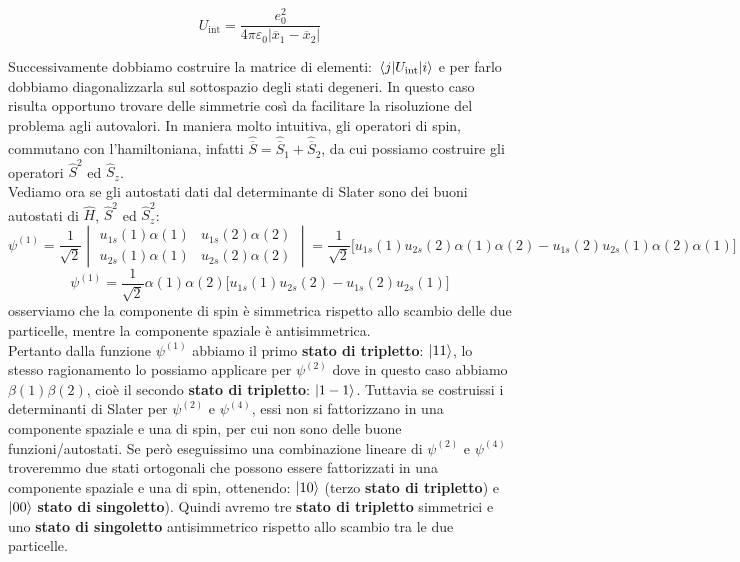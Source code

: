 \begin{equation*}
    U_{\text{int}}=\frac{e_0^2}{4\pi\varepsilon_0|\overline{x}_1-\overline{x}_2|}
\end{equation*}

Successivamente dobbiamo costruire la matrice di elementi: $\mel {j}{U_{\text{int}}}{i}$ e per farlo dobbiamo diagonalizzarla sul sottospazio degli stati degeneri. In questo caso risulta opportuno trovare delle simmetrie così da facilitare la risoluzione del problema agli autovalori. In maniera molto intuitiva, gli operatori di spin, commutano con l'hamiltoniana, infatti $\hat{\overline S} = \hat{\overline{S}}_1+\hat{\overline{S}}_2$, da cui possiamo costruire gli operatori $\hat S^2$ ed $\hat S_z$. \\
Vediamo ora se gli autostati dati dal determinante di Slater sono dei buoni autostati di $\hat H$, $\hat S^2$ ed $\hat S_z^2$:
\begin{equation*}
    \psi^{(1)}=\frac {1}{\sqrt 2} \begin{vmatrix} u_{1s}(1)\alpha(1) & u_{1s}(2)\alpha(2) \\ u_{2s}(1)\alpha(1) & u_{2s}(2)\alpha(2) \end{vmatrix}=\frac {1}{\sqrt 2} \big[u_{1s}(1)u_{2s}(2)\alpha(1)\alpha(2)-u_{1s}(2)u_{2s}(1)\alpha(2)\alpha(1)\big]
\end{equation*}
\begin{equation*}
    \psi^{(1)}=\frac {1}{\sqrt 2}\alpha(1)\alpha(2)\big[u_{1s}(1)u_{2s}(2)-u_{1s}(2)u_{2s}(1)\big]
\end{equation*}
osserviamo che la componente di spin è simmetrica rispetto allo scambio delle due particelle, mentre la componente spaziale è antisimmetrica.\\
Pertanto dalla funzione $\psi^{(1)}$ abbiamo il primo \textbf{stato di tripletto}: $\ket{11}$, lo stesso ragionamento lo possiamo applicare per $\psi^{(2)}$ dove in questo caso abbiamo $\beta(1)\beta(2)$, cioè il secondo \textbf{stato di tripletto}: $\ket{1-1}$. Tuttavia se costruissi i determinanti di Slater per $\psi^{(2)}$ e $\psi^{(4)}$, essi non si fattorizzano in una componente spaziale e una di spin, per cui non sono delle buone funzioni/autostati. Se però eseguissimo una combinazione lineare di $\psi^{(2)}$ e $\psi^{(4)}$ troveremmo due stati ortogonali che possono essere fattorizzati in una componente spaziale e una di spin, ottenendo: $\ket{10}$ (terzo \textbf{stato di tripletto}) e $\ket{00}$ \textbf{stato di singoletto}). Quindi avremo tre \textbf{stato di tripletto} simmetrici e uno \textbf{stato di singoletto} antisimmetrico rispetto allo scambio tra le due particelle.

